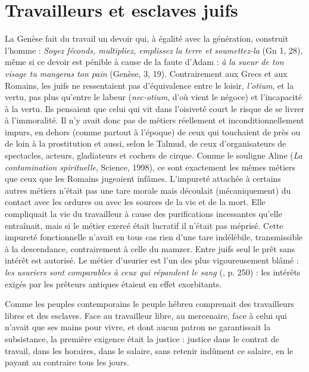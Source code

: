

\chapter{Travailleurs et esclaves juifs}

 La Genèse fait du travail un devoir qui, à égalité avec la génération, construit l'homme : {\emph{Soyez féconds, multipliez, emplissez la terre et soumettez-la}} (Gn 1, 28), même si ce devoir est pénible à cause de la faute d'Adam : {\emph{à la sueur de ton visage tu mangeras ton pain}} (Genèse, 3, 19). Contrairement aux Grecs et aux Romains, les juifs ne ressentaient pas d'équivalence entre le loisir, {\emph{l'otium}}, et la vertu, pas plus qu'entre le labeur ({\emph{nec-otium}}, d'où vient le négoce) et l'incapacité à la vertu. Ils pensaient que celui qui vit dans l'oisiveté court le risque de se livrer à l'immoralité. Il n'y avait donc pas de métiers réellement et inconditionnellement impurs, en dehors (comme partout à l'époque) de ceux qui touchaient de près ou de loin à la prostitution et aussi, selon le Talmud, de ceux d'organisateurs de spectacles, acteurs, gladiateurs et cochers de cirque. Comme le souligne Aline  (\emph{La contamination spirituelle}, Science, 1998), ce sont exactement les mêmes métiers que ceux que les Romains jugeaient infâmes. L'impureté attachée à certains autres métiers n'était pas une tare morale mais découlait (mécaniquement) du contact avec les ordures ou avec les sources de la vie et de la mort. Elle compliquait la vie du travailleur à cause des purifications incessantes qu'elle entraînait, mais si le métier exercé était lucratif il n'était pas méprisé. Cette impureté fonctionnelle n'avait en tous cas rien d'une tare indélébile, transmissible à la descendance, contrairement à celle du mamzer. Entre juifs seul le prêt sans intérêt est autorisé. Le métier d'usurier est l'un des plus vigoureusement blâmé : {\emph{les usuriers sont comparables à ceux qui répandent le sang}} (, p. 250) : les intérêts exigés par les prêteurs antiques étaient en effet exorbitants. 

 Comme les peuples contemporains le peuple hébreu comprenait des travailleurs libres et des esclaves. Face au travailleur libre, au mercenaire, face à celui qui n'avait que ses mains pour vivre, et dont aucun patron ne garantissait la subsistance, la première exigence était la justice : justice dans le contrat de travail, dans les horaires, dans le salaire, sans retenir indûment ce salaire, en le payant au contraire tous les jours.

